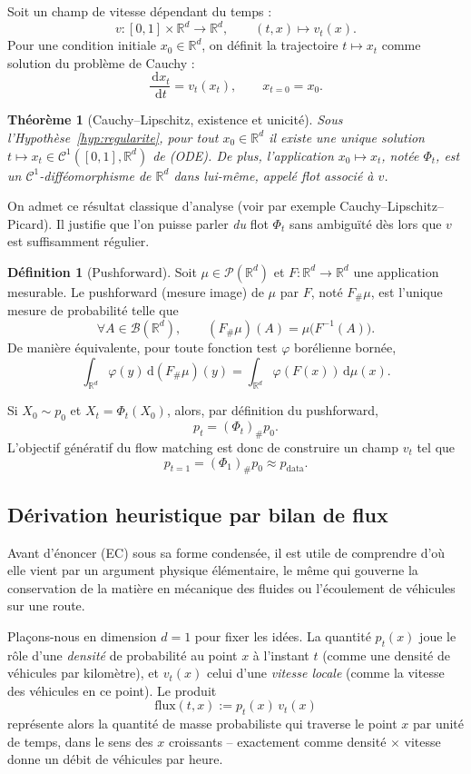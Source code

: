 \documentclass[11pt,a4paper]{article}
\theoremstyle{definition}
\newtheorem{definition}{Définition}[section]
\theoremstyle{plain}
\newtheorem{theoreme}{Théorème}[section]
\theoremstyle{remark}
\newcommand{\R}{\mathbb{R}}
\newcommand{\dd}{\,\mathrm{d}}
\begin{document}
Soit un champ de vitesse dépendant du temps :
\[
  v : [0,1]\times \R^d \to \R^d,
  \qquad
  (t,x)\mapsto v_t(x).
\]
Pour une condition initiale $x_0\in\R^d$, on définit la trajectoire $t\mapsto x_t$
comme solution du problème de Cauchy :
\[
  \frac{\dd x_t}{\dd t}=v_t(x_t),
  \qquad
  x_{t=0}=x_0.
  \tag{ODE}
\]

\begin{theoreme}[Cauchy--Lipschitz, existence et unicité]
Sous l'Hypothèse~\ref{hyp:regularite}, pour tout $x_0\in\R^d$ il existe une
unique solution $t\mapsto x_t\in\mathcal{C}^1([0,1],\R^d)$ de (ODE). De plus,
l'application $x_0\mapsto x_t$, notée $\Phi_t$, est un $\mathcal{C}^1$-difféomorphisme
de $\R^d$ dans lui-même, appelé \emph{flot} associé à $v$.
\end{theoreme}

On admet ce résultat classique d'analyse (voir par exemple Cauchy--Lipschitz--Picard).
Il justifie que l'on puisse parler \emph{du} flot $\Phi_t$ sans ambiguïté dès lors
que $v$ est suffisamment régulier.

\begin{definition}[Pushforward]
Soit $\mu\in\mathcal{P}(\R^d)$ et $F:\R^d\to\R^d$ une application mesurable. Le
pushforward (mesure image) de $\mu$ par $F$, noté $F_\#\mu$, est l'unique mesure
de probabilité telle que
\[
  \forall A\in\mathcal{B}(\R^d),\qquad
  (F_\#\mu)(A) = \mu\bigl(F^{-1}(A)\bigr).
\]
De manière équivalente, pour toute fonction test $\varphi$ borélienne bornée,
\[
  \int_{\R^d}\varphi(y)\dd (F_\#\mu)(y) = \int_{\R^d}\varphi(F(x))\dd\mu(x).
\]
\end{definition}

Si $X_0\sim p_0$ et $X_t=\Phi_t(X_0)$, alors, par définition du pushforward,
\[
  p_t = (\Phi_t)_\# p_0.
\]
L'objectif génératif du flow matching est donc de construire un champ $v_t$ tel
que
\[
  p_{t=1} = (\Phi_1)_\#p_0 \approx p_{\mathrm{data}}.
\]

\subsection{Dérivation heuristique par bilan de flux}

Avant d'énoncer (EC) sous sa forme condensée, il est utile de comprendre d'où
elle vient par un argument physique élémentaire, le même qui gouverne la
conservation de la matière en mécanique des fluides ou l'écoulement de
véhicules sur une route.

Plaçons-nous en dimension $d=1$ pour fixer les idées. La quantité $p_t(x)$ joue
le rôle d'une \emph{densité} de probabilité au point $x$ à l'instant $t$
(comme une densité de véhicules par kilomètre), et $v_t(x)$ celui d'une
\emph{vitesse locale} (comme la vitesse des véhicules en ce point). Le produit
\[
  \text{flux}(t,x) := p_t(x)\,v_t(x)
\]
représente alors la quantité de masse probabiliste qui traverse le point $x$
par unité de temps, dans le sens des $x$ croissants -- exactement comme
\og densité $\times$ vitesse \fg{} donne un débit de véhicules par heure.
\end{document}
